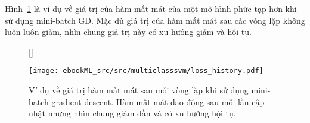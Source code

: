 Hình~\ref{fig:7_minibatch} là ví dụ về giá trị của hàm mất mát của một mô hình
phức tạp hơn khi sử dụng mini-batch GD. Mặc dù giá trị của hàm mất mát sau các
vòng lặp không luôn luôn giảm, nhìn chung giá trị này có xu hướng giảm và hội
tụ.

\begin{figure}[t]
   
    [\FBwidth]
    {\caption{ 
    Ví dụ về giá trị hàm mất mát sau mỗi vòng lặp khi sử dụng mini-batch
    gradient descent.
    Hàm mất mát dao động sau mỗi lần cập
    nhật nhưng nhìn chung giảm dần và có xu hướng hội tụ.
    }
    \label{fig:7_minibatch}}
    { %
    \texttt{[image: ebookML\_src/src/multiclasssvm/loss\_history.pdf]}
    }
\end{figure}
 
 
 
 




 

